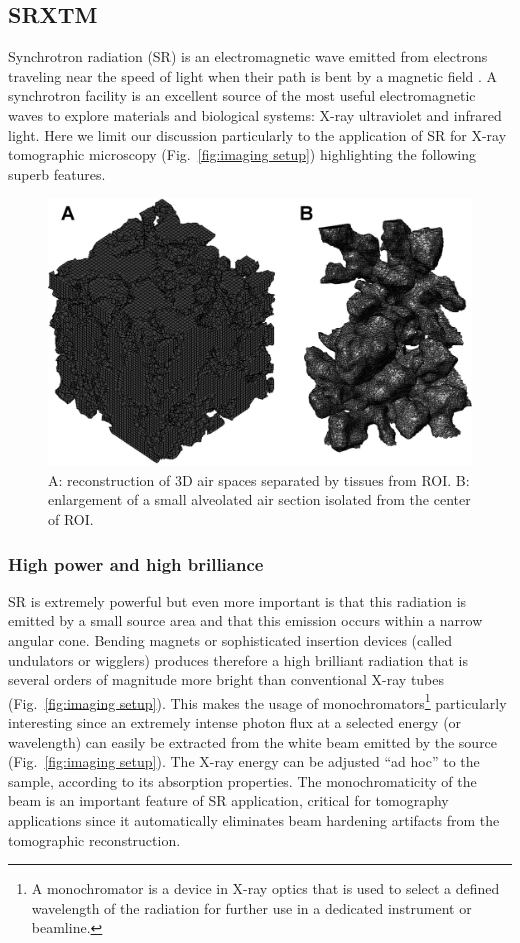 \subsection{SRXTM}
Synchrotron radiation (SR) is an electromagnetic wave emitted from electrons traveling near the speed of light when their path is bent by a magnetic field \cite{Iida2003}. A synchrotron facility is an excellent source of the most useful electromagnetic waves to explore materials and biological systems: X-ray ultraviolet and infrared light. Here we limit our discussion particularly to the application of SR for X-ray tomographic microscopy (Fig.~\ref{fig:imaging setup}) highlighting the following superb features.

\begin{figure}[htb]
	\centering
	\includegraphics[width=\imsize]{img/Tsuda2008/Tsuda-09}
	\caption[Three-dimensional reconstruction of air spaces]{A: reconstruction of 3D air spaces separated by tissues from ROI. B: enlargement of a small alveolated air section isolated from the center of ROI.}
	\label{fig:3dalveolated}
\end{figure}

\subsubsection{High power and high brilliance}
SR is extremely powerful but even more important is that this radiation is emitted by a small source area and that this emission occurs within a narrow angular cone. Bending magnets or sophisticated insertion devices (called undulators or wigglers) produces therefore a high brilliant radiation that is several orders of magnitude more bright than conventional X-ray tubes (Fig.~\ref{fig:imaging setup}). This makes the usage of monochromators\footnote{A monochromator is a device in X-ray optics that is used to select a defined wavelength of the radiation for further use in a dedicated instrument or beamline.} particularly interesting since an extremely intense photon flux at a selected energy (or wavelength) can easily be extracted from the white beam emitted by the source (Fig.~\ref{fig:imaging setup}). The X-ray energy can be adjusted ``ad hoc'' to the sample, according to its absorption properties. The monochromaticity of the beam is an important feature of SR application, critical for tomography applications since it automatically eliminates beam hardening artifacts from the tomographic reconstruction.

